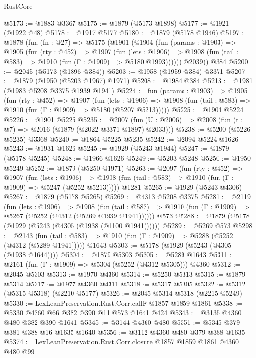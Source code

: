 \begin{lexlean}{RustCore}
\begin{coremodule}
@5173 := @1883 @3367
@5175 := @1879 (@5173 @1898)
@5177 := @1921 (@1922 @48)
@5178 := @1917 @5177
@5180 := @1879 (@5178 @1946)
@5197 := @1878
    (fun (fn : @27) =>
    @5175
      (@1901
        (@1904
          (fun (params : @1903) =>
          @1905
            (fun (rty : @452) =>
            @1907
              (fun (lets : @1906) =>
              @1908 (fun (tail : @583) => @1910 (fun (Γ : @1909) => @5180 @1993))))))
        @2039))
    @384
@5200 := @2045 (@5173 (@1896 @384))
@5203 := @1958 (@1959 @384) @3371
@5207 := @1879 (@1950 (@5203 @1967) @1971)
@5208 := @1984 @384
@5213 := @1981 (@1983 @5208 @3375 @1939 @1941)
@5224 := fun (params : @1903) =>
  @1905
    (fun (rty : @452) =>
    @1907
      (fun (lets : @1906) =>
      @1908 (fun (tail : @583) => @1910 (fun (Γ : @1909) => @5180 (@5207 @5213)))))
@5225 := @1904 @5224
@5226 := @1901 @5225
@5235 := @2007 (fun (U : @2006) => @2008 (fun (t : @7) => @2016 (@1879 (@2022 @3371 @1897) @2033)))
@5238 := @5200 (@5226 @5235) @3368
@5240 := @1864 @5225 @5235
@5242 := @2094 @5224 @1626
@5243 := @1931 @1626
@5245 := @1929 (@5243 @1944)
@5247 := @1879 (@5178 @5245)
@5248 := @1966 @1626
@5249 := @5203 @5248
@5250 := @1950 @5249
@5252 := @1879 (@5250 @1971)
@5263 := @2097
    (fun (rty : @452) =>
    @1907
      (fun (lets : @1906) =>
      @1908 (fun (tail : @583) => @1910 (fun (Γ : @1909) => @5247 (@5252 @5213)))))
    @1281
@5265 := @1929 (@5243 @4306)
@5267 := @1879 (@5178 @5265)
@5269 := @4313 @5208 @3375
@5281 := @2119
    (fun (lets : @1906) =>
    @1908
      (fun (tail : @583) => @1910 (fun (Γ : @1909) => @5267 (@5252 (@4312 (@5269 @1939 @1941))))))
    @573
@5288 := @1879 (@5178 (@1929 (@5243 (@4305 (@1938 (@1100 @1941))))))
@5289 := @5269 @573
@5298 := @2143
    (fun (tail : @583) => @1910 (fun (Γ : @1909) => @5288 (@5252 (@4312 (@5289 @1941)))))
    @1643
@5303 := @5178 (@1929 (@5243 (@4305 (@1938 @1644))))
@5304 := @1879 @5303
@5305 := @5289 @1643
@5311 := @2161 (fun (Γ : @1909) => @5304 (@5252 (@4312 @5305))) @4360
@5312 := @2045 @5303
@5313 := @1970 @4360
@5314 := @5250 @5313
@5315 := @1879 @5314
@5317 := @1977 @4360 @4311
@5318 := @5317 @5305
@5322 := @5312 (@5315 @5318) (@2210 @5177)
@5326 := @2045 @5314 @5318 (@2215 @5249)
@5330 := LexLeanPreservation.Rust.Corr.callF @1857 @1859 @1861
@5338 := @5330 @4360 @66 @382 @390 @11 @573 @1641 @424
@5343 := @3135 @4360 @480 @382 @390 @1641
@5345 := @3144 @4360 @480
@5351 := @5345 @379 @381 @388 @16 @1635 @1640
@5356 := @3112 @4360 @480 @379 @388 @1635
@5374 := LexLeanPreservation.Rust.Corr.closure
    @1857
    @1859
    @1861
    @4360
    @480
    @99

\end{coremodule}
\end{lexlean}
